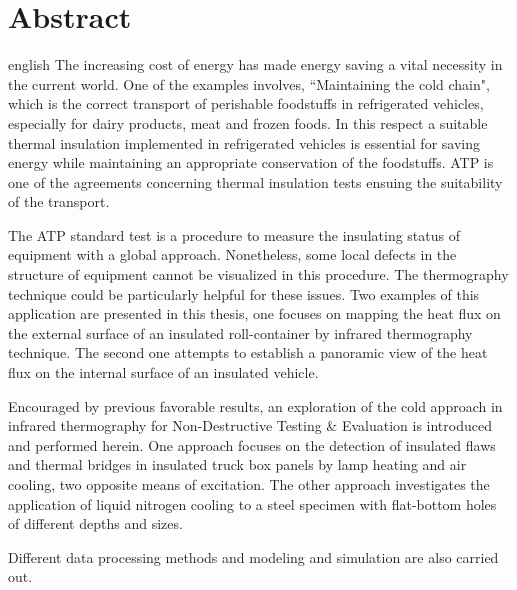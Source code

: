 \chapter*{Abstract}                      %

\begin{otherlanguage*}{english}
   The increasing cost of energy has made energy saving a vital necessity in the current world. One of the examples involves, ``Maintaining the cold chain", which is the correct transport of perishable foodstuffs in refrigerated vehicles, especially for dairy products, meat and frozen foods.  In this respect a suitable thermal insulation implemented in refrigerated vehicles is essential for saving energy while maintaining an appropriate conservation of the foodstuffs. ATP is one of the agreements concerning thermal insulation tests ensuing the suitability of the transport.
   
   The ATP standard test is a procedure to measure the insulating status of equipment with a global approach. Nonetheless, some local defects in the structure of equipment cannot be visualized in this procedure. The thermography technique could be particularly helpful for these issues. Two examples of this application are presented in this thesis, one focuses on mapping the heat flux on the external surface of an insulated roll-container by infrared thermography technique. The second one attempts to establish a panoramic view of the heat flux on the internal surface of an insulated vehicle. 
   
   Encouraged by previous favorable results, an exploration of the cold approach in infrared thermography for Non-Destructive Testing \& Evaluation is introduced and performed herein. One approach focuses on the detection of insulated flaws and thermal bridges in insulated truck box panels by lamp heating and air cooling, two opposite means of excitation. The other approach investigates the application of  liquid nitrogen cooling to a steel specimen with flat-bottom holes of different depths and sizes.
   
   Different data processing methods and modeling and simulation are also carried out.%
\end{otherlanguage*}
